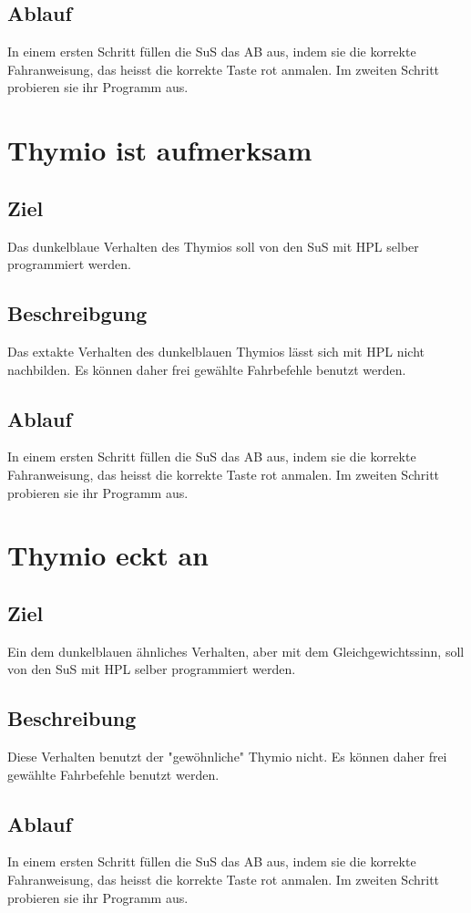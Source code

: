 \documentclass[12pt]{article}
\begin{document}
\subsection*{Ablauf}
In einem ersten Schritt füllen die SuS das AB aus, indem sie die korrekte Fahranweisung, das heisst die korrekte Taste rot anmalen. Im zweiten Schritt probieren sie ihr Programm aus.

\section*{Thymio ist aufmerksam}
\subsection*{Ziel}
Das dunkelblaue Verhalten des Thymios soll von den SuS mit HPL selber programmiert werden.
\subsection*{Beschreibgung}
Das extakte Verhalten des dunkelblauen Thymios lässt sich mit HPL nicht nachbilden.   Es können daher frei gewählte Fahrbefehle benutzt werden.
\subsection*{Ablauf}
In einem ersten Schritt füllen die SuS das AB aus, indem sie die korrekte Fahranweisung, das heisst die korrekte Taste rot anmalen. Im zweiten Schritt probieren sie ihr Programm aus.

\section*{Thymio eckt an}
\subsection*{Ziel}
Ein dem dunkelblauen ähnliches Verhalten, aber mit dem Gleichgewichtssinn,  soll von den SuS mit HPL selber programmiert werden.
\subsection*{Beschreibung}
Diese Verhalten benutzt der "gewöhnliche" Thymio nicht. Es können daher frei gewählte Fahrbefehle benutzt werden.
\subsection*{Ablauf}
In einem ersten Schritt füllen die SuS das AB aus, indem sie die korrekte Fahranweisung, das heisst die korrekte Taste rot anmalen. Im zweiten Schritt probieren sie ihr Programm aus.
\end{document}
